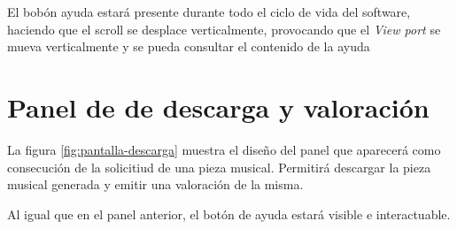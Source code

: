 El bobón ayuda estará presente durante todo el ciclo de vida del software, haciendo que el scroll se desplace verticalmente, provocando que el \emph{View port} se mueva verticalmente y se pueda consultar el contenido de la ayuda
 
\section{Panel de de descarga y valoración}

La figura \ref{fig:pantalla-descarga} muestra el diseño del panel que aparecerá como consecución de la solicitiud de una pieza musical. Permitirá descargar la pieza musical generada y emitir una valoración de la misma.


Al igual que en el panel anterior, el botón de ayuda estará visible e interactuable.

